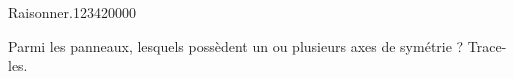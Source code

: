 \begin{pageAuto}
\begin{ExoAuto}{Raisonner.}{1234}{2}{0}{0}{0}{0}
%
%
%
%  

 
 Parmi les panneaux, lesquels possèdent un ou plusieurs axes de symétrie ? Trace-les.
 

\end{ExoAuto}
\end{pageAuto}
